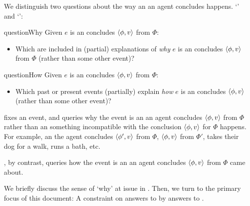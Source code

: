 \begin{note}
  We distinguish two questions about the way an  an agent concludes happens.
  `\qWhy{}' and `\qHow{}':

  \begin{question}{questionWhy}{\qWhy{}}
    Given \(e\) is an  \vAgent{} concludes \(\langle\phi, v\rangle\) from \(\Phi\):
    \begin{itemize}
    \item
      Which  are included in (partial) explanations of \emph{why} \(e\) is an  \vAgent{} concludes \(\langle\phi, v\rangle\) from \(\Phi\) (rather than some other event)?
    \end{itemize}
    \vspace{-1\baselineskip}
  \end{question}

  \begin{question}{questionHow}{\qHow{}}
    \label{q:how}
    Given \(e\) is an  \vAgent{} concludes \(\langle\phi, v\rangle\) from \(\Phi\):
    \begin{itemize}
    \item
      Which past or present events (partially) explain \emph{how} \(e\) is an  \vAgent{} concludes \(\langle\phi, v\rangle\) (rather than some other event)?
    \end{itemize}
    \vspace{-1.5\baselineskip}
  \end{question}
\end{note}


\begin{note}
  \qWhy{} fixes an event, and queries why the event is an  an agent concludes \(\langle\phi, v\rangle\) from \(\Phi\) rather than an  something incompatible with the conclusion \(\langle\phi, v\rangle\) for \(\Phi\) happens.
  For example, an  the agent concludes \(\langle\phi', v\rangle\) from \(\Phi\), \(\langle\phi, v\rangle\) from \(\Phi'\), takes their dog for a walk, runs a bath, etc.

  \qHow{}, by contrast, queries how the event is an  an agent concludes \(\langle\phi, v\rangle\) from \(\Phi\) came about.
\end{note}

\begin{note}
  We briefly discuss the sense of `why' at issue in \qWhy{}.
  Then, we turn to the primary focus of this document:
  A constraint on answers to \qWhy{} by answers to \qHow{}.
\end{note}


